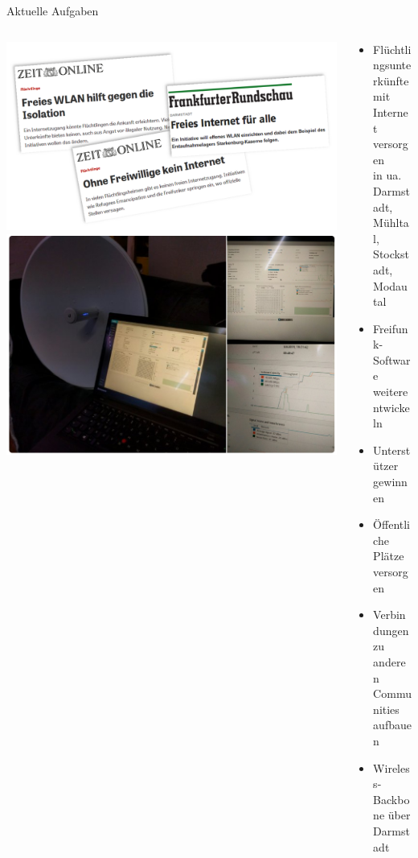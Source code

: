 \documentclass[10pt]{beamer}
\begin{document}
  \begin{frame}{Aktuelle Aufgaben}
    \begin{columns}[T]
      \begin{column}{5cm}
        \includegraphics[width=\textwidth]{images/2015-10_presse-fluechtlinge}
        \vspace{1em}
        \includegraphics[width=\textwidth]{images/powerbeam-mit-laptop}
      \end{column}
      \begin{column}{7cm}
      \begin{itemize}
        \item \large Flüchtlingsunterkünfte mit Internet versorgen\\
        \tiny in ua. Darmstadt, Mühltal, Stockstadt, Modautal\\
        \end{itemize}
        \begin{itemize}
          \item Freifunk-Software weiterentwickeln
          \item Unterstützer gewinnen
          \item Öffentliche Plätze versorgen
          \item Verbindungen zu anderen Communities aufbauen
          \item Wireless-Backbone über Darmstadt
        \end{itemize}
        \end{column}
      \end{columns}
    \end{frame}
  
\end{document}
